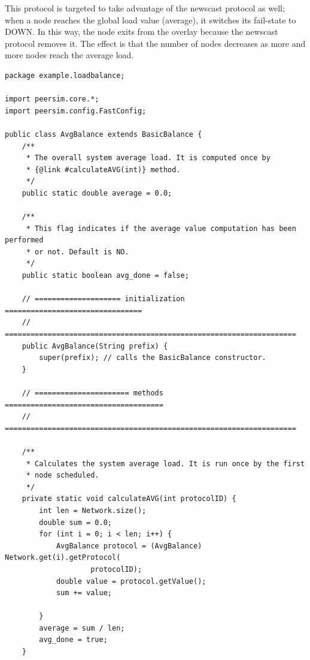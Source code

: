 \documentclass[a4paper,11pt]{article}
\begin{document}
This protocol is targeted to take advantage of the newscast protocol
as well; when a node reaches the global load value (average), it
switches its fail-state to DOWN. In this way, the node exits from the overlay
because the newscast protocol removes it. The effect is that
the number of nodes decreases as more and more nodes reach the average load.

\footnotesize
\begin{verbatim}
package example.loadbalance;

import peersim.core.*;
import peersim.config.FastConfig;

public class AvgBalance extends BasicBalance {
    /**
     * The overall system average load. It is computed once by
     * {@link #calculateAVG(int)} method.
     */
    public static double average = 0.0;

    /**
     * This flag indicates if the average value computation has been performed
     * or not. Default is NO.
     */
    public static boolean avg_done = false;

    // ==================== initialization ================================
    // ====================================================================
    public AvgBalance(String prefix) {
        super(prefix); // calls the BasicBalance constructor.
    }

    // ====================== methods =====================================
    // ====================================================================

    /**
     * Calculates the system average load. It is run once by the first
     * node scheduled. 
     */
    private static void calculateAVG(int protocolID) {
        int len = Network.size();
        double sum = 0.0;
        for (int i = 0; i < len; i++) {
            AvgBalance protocol = (AvgBalance) Network.get(i).getProtocol(
                    protocolID);
            double value = protocol.getValue();
            sum += value;

        }
        average = sum / len;
        avg_done = true;
    }
\end{verbatim}
\normalsize
\end{document}
